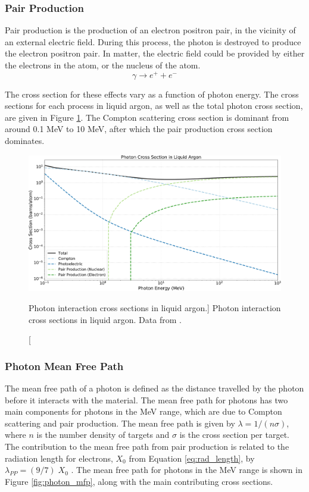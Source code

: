 \subsubsection*{Pair Production}
Pair production is the production of an electron positron pair, in the 
vicinity of an external electric field. During this process, the photon is
destroyed to produce the electron positron pair. In matter, the electric field
could be provided by either the electrons in the atom, or the nucleus of the
atom.
\begin{equation*}
	\gamma \rightarrow e^+ + e^-
\end{equation*}

\bigskip
The cross section for these effects vary as a function of photon energy. The 
cross sections for each process in liquid argon, as well as the total photon 
cross section, are given in Figure \ref{fig:photon_xsec}. The Compton scattering
cross section is dominant from around 0.1 MeV to 10 MeV, after which the pair
production cross section dominates. 

\begin{figure}

	\centering

	\includegraphics[width=\textwidth]{figures/photon_xsec.pdf}

	\caption
	[Photon interaction cross sections in liquid argon.]
	{ Photon interaction cross sections in liquid argon. Data from
	\cite{photon_xsec}.}

	\label{fig:photon_xsec}

\end{figure}

\subsubsection*{Photon Mean Free Path}
The mean free path of a photon is defined as the distance travelled by the
photon before it interacts with the material. The mean free path for photons
has two main components for photons in the MeV range, which are due to Compton
scattering and pair production. The mean free path is given by $\lambda = 1 / (n
\sigma)$, where $n$ is the number density of targets and $\sigma$ is the cross
section per target. The contribution to the mean free path from pair production
is related to the radiation length for electrons, $X_0$ from Equation
\ref{eq:rad_length}, by $\lambda_{PP} = (9/7) \; X_0$ \cite{PhysRevD.98.030001}.
The mean free path for photons in the MeV range is shown in Figure
\ref{fig:photon_mfp}, along with the main contributing cross sections. 


